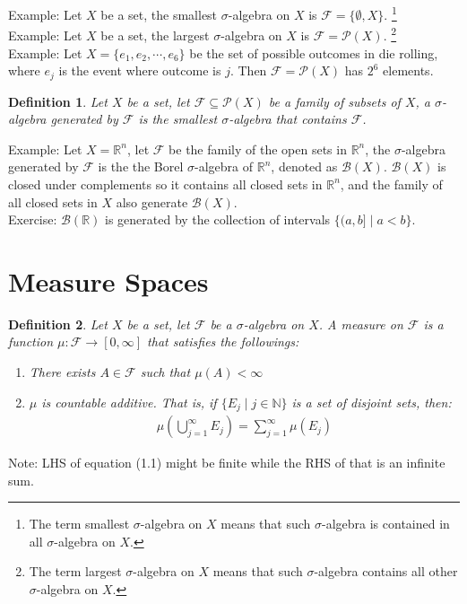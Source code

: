 \documentclass[11pt]{book}
\theoremstyle{break}
\theoremstyle{break}
\newtheorem{defn}{Definition}[corL]
\newcommand{\R}{\mathbb{R}}
\newcommand{\N}{\mathbb{N}}
\newcommand{\F}{\mathcal{F}}
\newcommand{\Power}{\mathcal{P}}
\newcommand{\note}{\color{red}Note: \color{black}}
\newcommand{\example}{\color{green}Example: \color{black}}
\newcommand{\exercise}{\color{green}Exercise: \color{black}}
\begin{document}
\example Let $X$ be a set, the smallest $\sigma$-algebra on $X$ is $\F = \{ \emptyset, X\}$. \footnote{The term smallest $\sigma$-algebra on $X$ means that such $\sigma$-algebra is contained in all $\sigma$-algebra on $X$.}\\
\example Let $X$ be a set, the largest $\sigma$-algebra on $X$ is $\F = \Power(X)$.  \footnote{The term largest $\sigma$-algebra on $X$ means that such $\sigma$-algebra contains all other $\sigma$-algebra on $X$.}\\

\example Let $X = \{e_1, e_2,\cdots, e_6\}$ be the set of possible outcomes in die rolling, where $e_j$ is the event where outcome is $j$.  Then $\F = \Power(X)$ has $2^6$ elements. \\

\begin{defn}
Let $X$ be a set, let $\F \subseteq \Power(X)$ be a family of subsets of $X$, a $\sigma$-algebra generated by $\F$ is the smallest $\sigma$-algebra that contains $\F$. 
\end{defn}

\example Let $X = \R^n$, let $\F$ be the family of the open sets in $\R^n$, the $\sigma$-algebra generated by $\F$ is the the Borel $\sigma$-algebra of $\R^n$, denoted as $\mathcal{B}(X)$. $\mathcal{B}(X)$ is closed under complements so it contains all closed sets in $\R^n$, and the family of all closed sets in $X$ also generate $\mathcal{B}(X)$. \\

\exercise $\mathcal{B}(\R)$ is generated by the collection of intervals $\{(a,b]\mid a<b\}$. \\


\newpage
\section[Measure Spaces]{\color{red}Measure Spaces\color{black}}
\begin{defn}
Let $X$ be a set, let $\F$ be a $\sigma$-algebra on $X$. A measure on $\F$ is a function $\mu:\F \to [0,\infty]$ that satisfies the followings: 
\begin{enumerate}[topsep=3pt,itemsep=-1ex,partopsep=1ex,parsep=1ex]
\item There exists $ A \in \F$ such that $\mu(A) < \infty$
\item $\mu$ is countable additive. That is, if $\{E_j \mid j\in \N\}$ is a set of disjoint sets, then:
\begin{align}
\mu\left(\bigcup_{j=1}^\infty E_j \right) = \sum_{j=1}^\infty \mu(E_j)
\end{align}
\end{enumerate}
\end{defn}
\note LHS of equation (1.1) might be finite while the RHS of that is an infinite sum.
\end{document}
